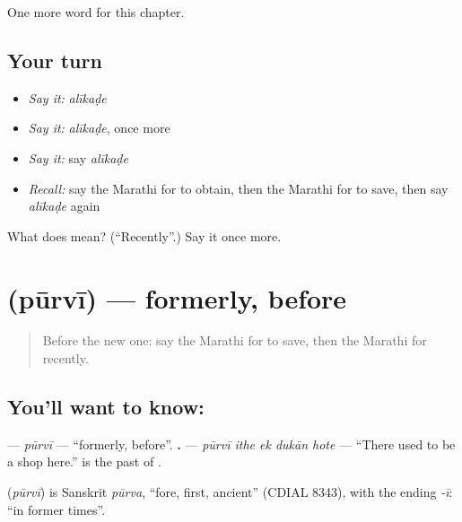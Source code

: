 \begin{grammarlens}[title={What you've built}]
One more word for this chapter.
\end{grammarlens}

\subsection*{Your turn}
\begin{itemize}
\raggedright
  \item \emph{Say it:} \emph{alīkaḍe}
  \item \emph{Say it:} \emph{alīkaḍe}, once more
  \item \emph{Say it:} say \emph{alīkaḍe}
  \item \emph{Recall:} say the Marathi for to obtain, then the Marathi for to save, then say \emph{alīkaḍe} again
\end{itemize}

\begin{tcolorbox}[breakable,colback=teal!4,colframe=teal!35!black,title={Before you move on}]
What does  mean? (\textquotedblleft{}Recently\textquotedblright{}.) Say it once more.
\end{tcolorbox}
\section[\texorpdfstring{\mr{पूर्वी} (pūrvī)}{पूर्वी (pūrvī)}]{ (pūrvī) — formerly, before}

\label{lesson:MR-C159-purvi}



\begin{quote}
Before the new one: say the Marathi for to save, then the Marathi for recently.
\end{quote}

\subsection*{You'll want to know: }
\textbf{} — \emph{pūrvī} — \textquotedblleft{}formerly, before\textquotedblright{}. \textbf{    .} — \emph{pūrvī ithe ek dukān hote} — \textquotedblleft{}There used to be a shop here.\textquotedblright{} \textbf{} is the past of \textbf{}.

\begin{cousinweb}
\textbf{} (\emph{pūrvī}) is Sanskrit \emph{pūrva}, \textquotedblleft{}fore, first, ancient\textquotedblright{} (CDIAL 8343), with the ending \emph{-ī}: \textquotedblleft{}in former times\textquotedblright{}.
\end{cousinweb}

